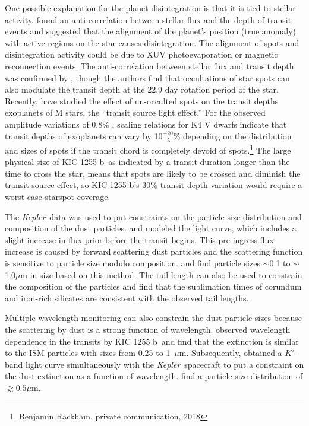 \documentclass[preprint]{aastex61}
\newcommand{\sha}{KIC 1255 b}
\newcommand{\kepler}{{\it Kepler}}
\begin{document}
One possible explanation for the planet disintegration is that it is tied to stellar activity.
\citet{kawahara2013starspots} found an anti-correlation between stellar flux and the depth of transit events and suggested that the alignment of the planet's position (true anomaly) with active regions on the star causes disintegration.
The alignment of spots and disintegration activity could be due to XUV photoevaporation or magnetic reconnection events.
The anti-correlation between stellar flux and transit depth was confirmed by \citet{croll2015starspots}, though the authors find that occultations of star spots can also modulate the transit depth at the 22.9 day rotation period of the star.
Recently, \citet{rackham2018transitSourceEffect} have studied the effect of un-occulted spots on the transit depths exoplanets of M stars, the ``transit source light effect.''
For the observed amplitude variations of 0.8\% \citep{kawahara2013starspots}, scaling relations for K4 V dwarfs indicate that transit depths of exoplanets can vary by 10$^{+20}_{-5}$\% depending on the distribution and sizes of spots if the transit chord is completely devoid of spots.\footnote{Benjamin Rackham, private communication, 2018}
The large physical size of \sha\, as indicated by a transit duration longer than the time to cross the star, means that spots are likely to be crossed and diminish the transit source effect, so \sha's 30\% transit depth variation would require a worst-case starspot coverage.

The \kepler\ data was used to put constraints on the particle size distribution and composition of the dust particles.
\citet{budaj12} and \citet{brogi2012} modeled the light curve, which includes a slight increase in flux prior before the transit begins.
This pre-ingress flux increase is caused by forward scattering dust particles and the scattering function is sensitive to particle size modulo composition.
\citet{budaj12} and \citet{brogi2012} find particle sizes $\sim$0.1 to $\sim$1.0$\mu$m in size based on this method.
The tail length can also be used to constrain the composition of the particles and \citet{vanlieshout2014kic1255comp} find that the sublimation times of corundum and iron-rich silicates are consistent with the observed tail lengths.

Multiple wavelength monitoring can also constrain the dust particle sizes because the scattering by dust is a strong function of wavelength.
\citet{bochinski2015evolving} observed wavelength dependence in the transits by \sha\ and find that the extinction is similar to the ISM particles with sizes from 0.25 to 1~$\mu$m.
Subsequently, \citet{croll2014} obtained a $K'$-band light curve simultaneously with the \kepler\ spacecraft to put a constraint on the dust extinction as a function of wavelength.
\citet{croll2014} find a particle size distribution of $\gtrsim 0.5\mu$m.
\end{document}
